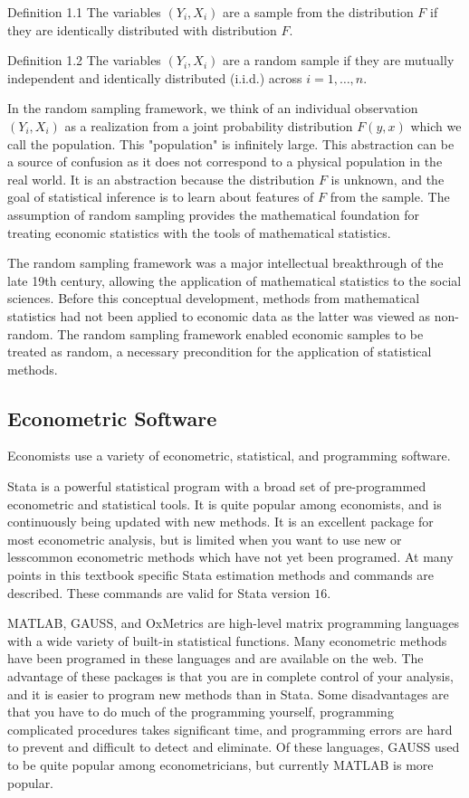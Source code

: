 \documentclass[10pt]{article}
\begin{document}
Definition 1.1 The variables $\left(Y_{i}, X_{i}\right)$ are a sample from the distribution $F$ if they are identically distributed with distribution $F$.

Definition 1.2 The variables $\left(Y_{i}, X_{i}\right)$ are a random sample if they are mutually independent and identically distributed (i.i.d.) across $i=1, \ldots, n$.

In the random sampling framework, we think of an individual observation $\left(Y_{i}, X_{i}\right)$ as a realization from a joint probability distribution $F(y, x)$ which we call the population. This "population" is infinitely large. This abstraction can be a source of confusion as it does not correspond to a physical population in the real world. It is an abstraction because the distribution $F$ is unknown, and the goal of statistical inference is to learn about features of $F$ from the sample. The assumption of random sampling provides the mathematical foundation for treating economic statistics with the tools of mathematical statistics.

The random sampling framework was a major intellectual breakthrough of the late 19th century, allowing the application of mathematical statistics to the social sciences. Before this conceptual development, methods from mathematical statistics had not been applied to economic data as the latter was viewed as non-random. The random sampling framework enabled economic samples to be treated as random, a necessary precondition for the application of statistical methods.

\subsection{Econometric Software}
Economists use a variety of econometric, statistical, and programming software.

Stata is a powerful statistical program with a broad set of pre-programmed econometric and statistical tools. It is quite popular among economists, and is continuously being updated with new methods. It is an excellent package for most econometric analysis, but is limited when you want to use new or lesscommon econometric methods which have not yet been programed. At many points in this textbook specific Stata estimation methods and commands are described. These commands are valid for Stata version $16 .$

MATLAB, GAUSS, and OxMetrics are high-level matrix programming languages with a wide variety of built-in statistical functions. Many econometric methods have been programed in these languages and are available on the web. The advantage of these packages is that you are in complete control of your analysis, and it is easier to program new methods than in Stata. Some disadvantages are that you have to do much of the programming yourself, programming complicated procedures takes significant time, and programming errors are hard to prevent and difficult to detect and eliminate. Of these languages, GAUSS used to be quite popular among econometricians, but currently MATLAB is more popular.
\end{document}

